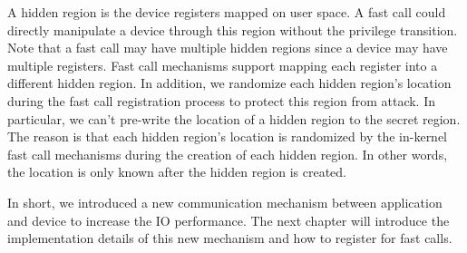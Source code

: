 A hidden region is the device registers mapped on user space. 
A fast call could directly manipulate a device through this region without 
the privilege transition. Note that a fast call may have multiple hidden 
regions since a device may have multiple registers. Fast call mechanisms 
support mapping each register into a different hidden region. In addition,
we randomize each hidden region's location during the fast call registration 
process to protect this region from attack.  In particular, we can't pre-write 
the location of a hidden region to the secret region. The reason is that each hidden 
region's location is randomized by the in-kernel fast call mechanisms during the creation 
of each hidden region. In other words,  the location is only known after the hidden region is created. 

In short, we introduced a new communication mechanism between 
application and device to increase the IO performance. 
The next chapter will introduce the implementation details 
of this new mechanism and how to register for fast calls.
\cleardoublepage


